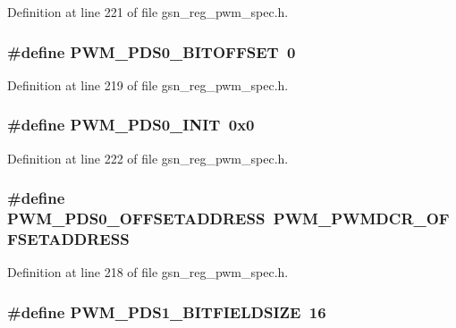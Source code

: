 Definition at line 221 of file gsn\_\-reg\_\-pwm\_\-spec.h.

\hypertarget{a00565_af3c6c14f418969466a1158fda8273532}{
\subsubsection[{PWM\_\-PDS0\_\-BITOFFSET}]{\setlength{\rightskip}{0pt plus 5cm}\#define PWM\_\-PDS0\_\-BITOFFSET~0}}
\label{a00565_af3c6c14f418969466a1158fda8273532}


Definition at line 219 of file gsn\_\-reg\_\-pwm\_\-spec.h.

\hypertarget{a00565_ac9074da35e87234a5ea38426c9018ec4}{
\subsubsection[{PWM\_\-PDS0\_\-INIT}]{\setlength{\rightskip}{0pt plus 5cm}\#define PWM\_\-PDS0\_\-INIT~0x0}}
\label{a00565_ac9074da35e87234a5ea38426c9018ec4}


Definition at line 222 of file gsn\_\-reg\_\-pwm\_\-spec.h.

\hypertarget{a00565_a53f03ec64fe15d3148e7ad970868031b}{
\subsubsection[{PWM\_\-PDS0\_\-OFFSETADDRESS}]{\setlength{\rightskip}{0pt plus 5cm}\#define PWM\_\-PDS0\_\-OFFSETADDRESS~PWM\_\-PWMDCR\_\-OFFSETADDRESS}}
\label{a00565_a53f03ec64fe15d3148e7ad970868031b}


Definition at line 218 of file gsn\_\-reg\_\-pwm\_\-spec.h.

\hypertarget{a00565_a7264db9b33ba8cc42ff8de1a909850a4}{
\subsubsection[{PWM\_\-PDS1\_\-BITFIELDSIZE}]{\setlength{\rightskip}{0pt plus 5cm}\#define PWM\_\-PDS1\_\-BITFIELDSIZE~16}}
\label{a00565_a7264db9b33ba8cc42ff8de1a909850a4}


